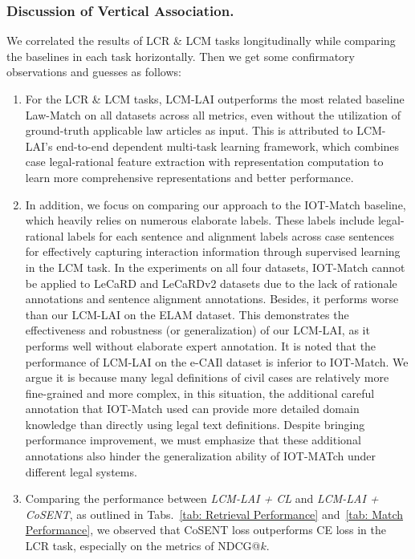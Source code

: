 \subsubsection{Discussion of Vertical Association.} \label{sec: basic_performance}
We correlated the results of LCR \& LCM tasks longitudinally while comparing the baselines in each task horizontally.
Then we get some confirmatory observations and guesses as follows:
\begin{enumerate}
    \item {
    For the LCR \& LCM tasks, LCM-LAI outperforms the most related baseline Law-Match on all datasets across all metrics, even without the utilization of ground-truth applicable law articles as input.
    This is attributed to LCM-LAI's end-to-end dependent multi-task learning framework, which combines case legal-rational feature extraction with representation computation to learn more comprehensive representations and better performance.
    }
    \item {
    In addition, we focus on comparing our approach to the IOT-Match baseline, which heavily relies on numerous elaborate labels.
    These labels include legal-rational labels for each sentence and alignment labels across case sentences for effectively capturing interaction information through supervised learning in the LCM task.
    In the experiments on all four datasets, IOT-Match cannot be applied to LeCaRD and LeCaRDv2 datasets due to the lack of rationale annotations and sentence alignment annotations.
    Besides, it performs worse than our LCM-LAI on the ELAM dataset.
    This demonstrates the effectiveness and robustness (or generalization) of our LCM-LAI, as it performs well without elaborate expert annotation.
    It is noted that the performance of LCM-LAI on the e-CAIl dataset is inferior to IOT-Match.
    We argue it is because many legal definitions of civil cases are relatively more fine-grained and more complex, 
    in this situation, the additional careful annotation that IOT-Match used can provide more detailed domain knowledge than directly using legal text definitions.
    Despite bringing performance improvement, we must emphasize that these additional annotations also hinder the generalization ability of IOT-MATch under different legal systems.
    }
    \item {
    Comparing the performance between \textit{LCM-LAI + CL} and \textit{LCM-LAI + CoSENT}, as outlined in Tabs.~\ref{tab: Retrieval Performance} and~\ref{tab: Match Performance}, we observed that CoSENT loss outperforms CE loss in the LCR task, especially on the metrics of NDCG@$k$.
}
\end{enumerate}
